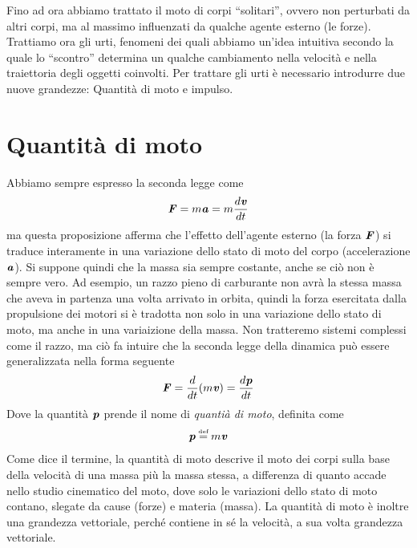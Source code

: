 \marginpar{\minitoc}

Fino ad ora abbiamo trattato il moto di corpi ``solitari'', ovvero non
perturbati da altri corpi, ma al massimo influenzati da qualche agente
esterno (le forze). Trattiamo ora gli urti, fenomeni dei quali abbiamo
un'idea intuitiva secondo la quale lo ``scontro'' determina un qualche
cambiamento nella velocità e nella traiettoria degli oggetti coinvolti.
Per trattare gli urti è necessario introdurre due nuove grandezze:
Quantità di moto e impulso.


\section{Quantità di moto}
Abbiamo sempre espresso la seconda legge come
\[ \textbf{\textit{F}} = m\textbf{\textit{a}} = m\frac{d\textbf{\textit{v}}}{dt} \]
ma questa proposizione afferma che l'effetto dell'agente esterno (la forza
$\textbf{\textit{F}}$) si traduce interamente in una variazione dello stato di
moto del corpo (accelerazione $\textbf{\textit{a}}$). Si suppone quindi che la
massa sia sempre costante, anche se ciò non è sempre vero. Ad esempio,
un razzo pieno di carburante non avrà la stessa massa che aveva in partenza
una volta arrivato in orbita, quindi la forza esercitata dalla propulsione
dei motori si è tradotta non solo in una variazione dello stato di moto,
ma anche in una variaizione della massa. Non tratteremo sistemi complessi
come il razzo, ma ciò fa intuire che la seconda legge della dinamica può
essere generalizzata nella forma seguente
\begin{align}
    \textbf{\textit{F}} = \frac{d}{dt}(m\textbf{\textit{v}}) = \frac{d\textbf{\textit{p}}}{dt}\label{qtamotosecondalegge}
\end{align}
Dove la quantità $\textbf{\textit{p}}$ prende il nome di \textit{quantià di moto},
definita come
\begin{align}
    \vecsymb{p} \eqdef m\vecsymb{v}
\end{align}
Come dice il termine, la quantità di moto descrive il moto dei corpi
sulla base della velocità di una massa più la massa stessa, a differenza
di quanto accade nello studio cinematico del moto, dove solo le variazioni
dello stato di moto contano, slegate da cause (forze) e materia (massa).
La quantità di moto è inoltre una grandezza vettoriale, perché contiene
in sé la velocità, a sua volta grandezza vettoriale.



